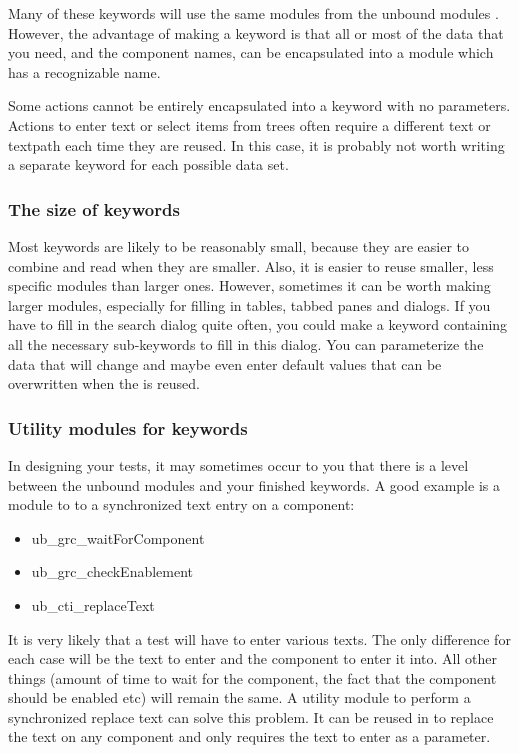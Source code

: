 Many of these keywords will use the same modules from the unbound modules \gdproject{}. However, the advantage of making a keyword is that all or most of the data that you need, and the component names, can be encapsulated into a module which has a recognizable name. 

Some actions cannot be entirely encapsulated into a keyword with no parameters. Actions to enter text or select items from trees often require a different text or textpath each time they are reused. In this case, it is probably not worth writing a separate keyword for each possible data set. 



\subsubsection{The size of keywords}
Most keywords are likely to be reasonably small, because they are easier to combine and read when they are smaller. Also, it is easier to reuse smaller, less specific modules than larger ones. However, sometimes it can be worth making larger modules, especially for filling in tables, tabbed panes and dialogs. If you have to fill in the search dialog quite often, you could make a keyword containing all the necessary sub-keywords to fill in this dialog. You can parameterize the data that will change and maybe even enter default values that can be overwritten when the \gdcase{} is reused. 

\subsubsection{Utility modules for keywords}
\label{BPKeywordsUtility}
In designing your tests, it may sometimes occur to you that there is a level between the unbound modules and your finished keywords. A good example is a module to to a synchronized text entry on a component:
\begin{itemize}
\item ub\_grc\_waitForComponent 
\item ub\_grc\_checkEnablement
\item ub\_cti\_replaceText
\end{itemize}

It is very likely that a test will have to enter various texts. The only difference for each case will be the text to enter and the component to enter it into. All other things (amount of time to wait for the component, the fact that the component should be enabled etc) will remain the same. A utility module to perform a synchronized replace text can solve this problem. It can be reused in \gdcases{} to replace the text on any component  and only requires the text to enter as a parameter. 

